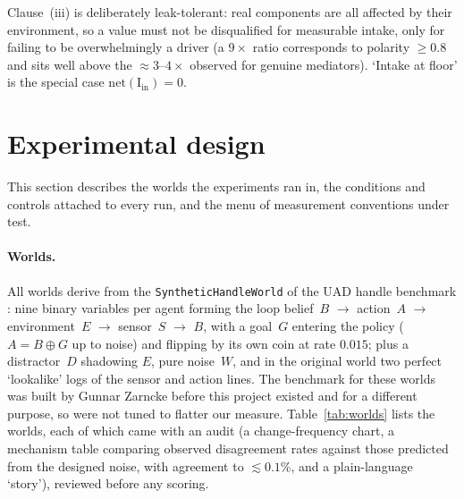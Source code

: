 \documentclass[11pt]{article}
\newcommand{\I}{\mathrm{I}}
\newcommand{\net}{\mathrm{net}}
\newcommand{\vin}{\mathrm{in}}
\newcommand{\gplus}{\oplus}
\newcommand{\pkg}[1]{\texttt{#1}}
\begin{document}
Clause~(iii) is deliberately leak-tolerant: real components are all affected by their
environment, so a value must not be disqualified for measurable intake, only for
failing to be overwhelmingly a driver (a $9\times$ ratio corresponds to polarity
$\geq 0.8$ and sits well above the $\approx 3$--$4\times$ observed for genuine
mediators). `Intake at floor' is the special case $\net(\I_\vin)=0$.

\section{Experimental design}

This section describes the worlds the experiments ran in, the conditions and
controls attached to every run, and the menu of measurement conventions under test.

\paragraph{Worlds.}
All worlds derive from the \pkg{SyntheticHandleWorld} of the UAD handle benchmark
\citep{zarncke2025uad}: nine binary variables per agent forming the loop
belief~$B$ $\to$ action~$A$ $\to$ environment~$E$ $\to$ sensor~$S$ $\to$ $B$, with a
goal~$G$ entering the policy ($A = B\gplus G$ up to noise) and flipping by its own coin
at rate $0.015$; plus a distractor~$D$ shadowing $E$, pure noise~$W$, and in the original
world two perfect `lookalike' logs of the sensor and action lines. The benchmark for these worlds was built
by Gunnar Zarncke before this project existed and for a different purpose, so were not
tuned to flatter our measure. Table~\ref{tab:worlds} lists the worlds, each of
which came with an audit (a change-frequency chart, a mechanism table comparing observed
disagreement rates against those predicted from the designed noise, with agreement to
$\lesssim 0.1$\%, and a plain-language `story'), reviewed before any scoring.
\end{document}
